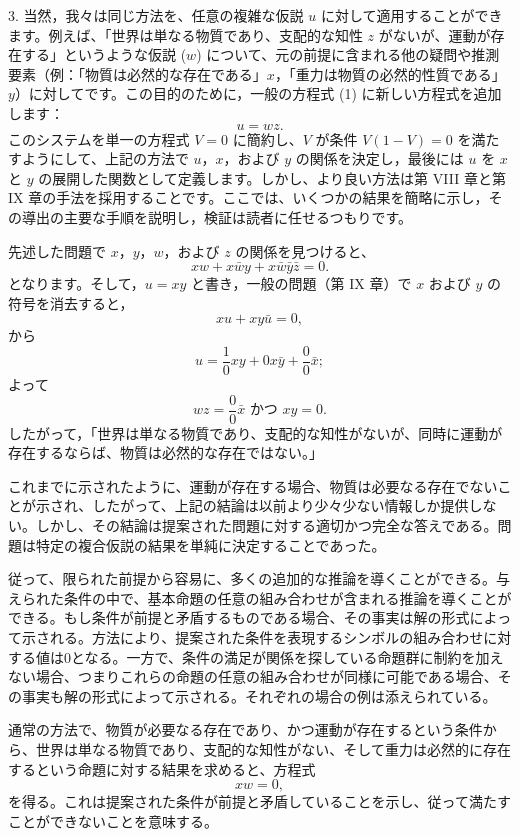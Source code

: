 \documentclass[a4paper,11pt,openany]{ltjsbook}
\begin{document}
3. 当然，我々は同じ方法を、任意の複雑な仮説 \( u \) に対して適用することができます。例えば、「世界は単なる物質であり、支配的な知性 \( z \) がないが、運動が存在する」というような仮説 (\( w \)) について、元の前提に含まれる他の疑問や推測要素（例：「物質は必然的な存在である」\( x \)，「重力は物質の必然的性質である」\( y \)）に対してです。この目的のために，一般の方程式 (1) に新しい方程式を追加します：
\[
u = wz.
\]
このシステムを単一の方程式 \( V=0 \) に簡約し、\( V \) が条件 \( V(1-V) = 0 \) を満たすようにして、上記の方法で \( u \)，\( x \)，および \( y \) の関係を決定し，最後には \( u \) を \( x \) と \( y \) の展開した関数として定義します。しかし、より良い方法は第 VIII 章と第 IX 章の手法を採用することです。ここでは、いくつかの結果を簡略に示し，その導出の主要な手順を説明し，検証は読者に任せるつもりです。

先述した問題で \( x \)，\( y \)，\( w \)，および \( z \) の関係を見つけると、
\[
xw + x\bar{w}y + x\bar{w}\bar{y}\bar{z} = 0.
\]
となります。そして，\( u = xy \) と書き，一般の問題（第 IX 章）で \( x \) および \( y \) の符号を消去すると，
\[
xu + xy\bar{u} = 0,
\]
から
\[
u=\frac{1}{0}xy+0x\bar{y}+\frac{0}{0}\bar{x};
\]
よって
\[
wz=\frac{0}{0}\bar{x}\text{ かつ }xy=0.
\]
したがって，「世界は単なる物質であり、支配的な知性がないが、同時に運動が存在するならば、物質は必然的な存在ではない。」

これまでに示されたように、運動が存在する場合、物質は必要なる存在でないことが示され、したがって、上記の結論は以前より少々少ない情報しか提供しない。しかし、その結論は提案された問題に対する適切かつ完全な答えである。問題は特定の複合仮説の結果を単純に決定することであった。

従って、限られた前提から容易に、多くの追加的な推論を導くことができる。与えられた条件の中で、基本命題の任意の組み合わせが含まれる推論を導くことができる。もし条件が前提と矛盾するものである場合、その事実は解の形式によって示される。方法により、提案された条件を表現するシンボルの組み合わせに対する値は0となる。一方で、条件の満足が関係を探している命題群に制約を加えない場合、つまりこれらの命題の任意の組み合わせが同様に可能である場合、その事実も解の形式によって示される。それぞれの場合の例は添えられている。

通常の方法で、物質が必要なる存在であり、かつ運動が存在するという条件から、世界は単なる物質であり、支配的な知性がない、そして重力は必然的に存在するという命題に対する結果を求めると、方程式
\begin{equation*}
xw = 0,
\end{equation*}
を得る。これは提案された条件が前提と矛盾していることを示し、従って満たすことができないことを意味する。
\end{document}
